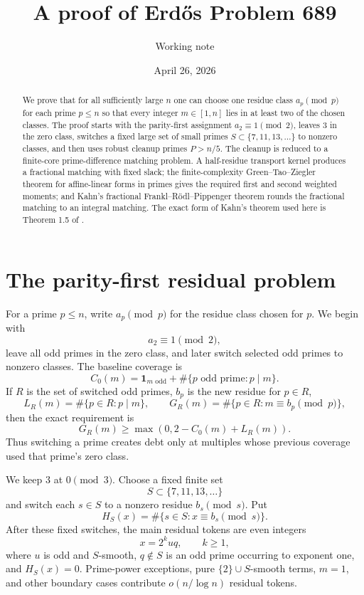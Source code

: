 \documentclass[11pt]{article}
\title{A proof of Erd\H{o}s Problem 689}
\author{Working note}
\date{April 26, 2026}
\newcommand{\one}{\mathbf 1}
\begin{document}
\maketitle

\begin{abstract}
We prove that for all sufficiently large $n$ one can choose one residue class
$a_p\pmod p$ for each prime $p\le n$ so that every integer $m\in[1,n]$ lies in
at least two of the chosen classes.  The proof starts with the parity-first
assignment $a_2\equiv1\pmod2$, leaves $3$ in the zero class, switches a fixed
large set of small primes $S\subset\{7,11,13,\ldots\}$ to nonzero classes, and
then uses robust cleanup primes $P>n/5$.  The cleanup is reduced to a
finite-core prime-difference matching problem.  A half-residue transport kernel
produces a fractional matching with fixed slack; the finite-complexity
Green--Tao--Ziegler theorem for affine-linear forms in primes gives the
required first and second weighted moments; and Kahn's fractional
Frankl--R\"odl--Pippenger theorem rounds the fractional matching to an integral
matching.  The exact form of Kahn's theorem used here is Theorem 1.5 of
\cite{Kahn1996}.
\end{abstract}

\section{The parity-first residual problem}

For a prime $p\le n$, write $a_p\pmod p$ for the residue class chosen for $p$.
We begin with
\[
  a_2\equiv1\pmod2,
\]
leave all odd primes in the zero class, and later switch selected odd primes to
nonzero classes.  The baseline coverage is
\[
  C_0(m)=\one_{m\text{ odd}}+\#\{p\text{ odd prime}:p\mid m\}.
\]
If $R$ is the set of switched odd primes, $b_p$ is the new residue for $p\in R$,
\[
  L_R(m)=\#\{p\in R:p\mid m\},\qquad
  G_R(m)=\#\{p\in R:m\equiv b_p\pmod p\},
\]
then the exact requirement is
\[
  G_R(m)\ge \max(0,2-C_0(m)+L_R(m)).       \tag{1}
\]
Thus switching a prime creates debt only at multiples whose previous coverage
used that prime's zero class.

We keep $3$ at $0\pmod3$.  Choose a fixed finite set
\[
  S\subset\{7,11,13,\ldots\}
\]
and switch each $s\in S$ to a nonzero residue $b_s\pmod s$.  Put
\[
  H_S(x)=\#\{s\in S:x\equiv b_s\pmod s\}.
\]
After these fixed switches, the main residual tokens are even integers
\[
  x=2^k u q,
  \qquad k\ge1,                                      \tag{2}
\]
where $u$ is odd and $S$-smooth, $q\notin S$ is an odd prime occurring to
exponent one, and $H_S(x)=0$.  Prime-power exceptions, pure
$\{2\}\cup S$-smooth terms, $m=1$, and other boundary cases contribute
$o(n/\log n)$ residual tokens.
\end{document}

